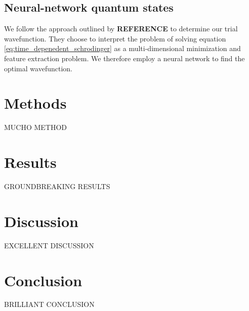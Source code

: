 \documentclass[a4paper, 10pt]{article}
\begin{document}
	\subsection{Neural-network quantum states}
	We follow the approach outlined by \textbf{REFERENCE} to determine our trial wavefunction. They choose to interpret the problem of solving equation \ref{eq:time_depenedent_schrodinger} as a multi-dimensional minimization and feature extraction problem. We therefore employ a neural network to find the optimal wavefunction.
	\section{Methods}\label{Method_section}
	MUCHO METHOD
	\section{Results}
	GROUNDBREAKING RESULTS
	\section{Discussion}
	EXCELLENT DISCUSSION
	\section{Conclusion}
	BRILLIANT CONCLUSION
\end{document}
